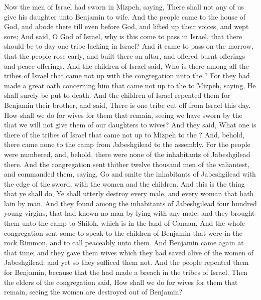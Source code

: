 \columnbreak %

\begin{biblechapter} %
 Now the men of Israel had sworn in Mizpeh, saying, There shall not any of us give his daughter unto Benjamin to wife.
\verse And the people came to the house of God, and abode there till even before God, and lifted up their voices, and wept sore;
\verse And said, O \LORD God of Israel, why is this come to pass in Israel, that there should be to day one tribe lacking in Israel?
\verse And it came to pass on the morrow, that the people rose early, and built there an altar, and offered burnt offerings and peace offerings.
\verse And the children of Israel said, Who is there among all the tribes of Israel that came not up with the congregation unto the \LORD? For they had made a great oath concerning him that came not up to the \LORD to Mizpeh, saying, He shall surely be put to death.
\verse And the children of Israel repented them for Benjamin their brother, and said, There is one tribe cut off from Israel this day.
\verse How shall we do for wives for them that remain, seeing we have sworn by the \LORD that we will not give them of our daughters to wives?
\verse And they said, What one is there of the tribes of Israel that came not up to Mizpeh to the \LORD? And, behold, there came none to the camp from Jabeshgilead to the assembly.
\verse For the people were numbered, and, behold, there were none of the inhabitants of Jabeshgilead there.
\verse And the congregation sent thither twelve thousand men of the valiantest, and commanded them, saying, Go and smite the inhabitants of Jabeshgilead with the edge of the sword, with the women and the children.
\verse And this is the thing that ye shall do, Ye shall utterly destroy every male, and every woman that hath lain by man.
\verse And they found among the inhabitants of Jabeshgilead four hundred young virgins, that had known no man by lying with any male: and they brought them unto the camp to Shiloh, which is in the land of Canaan.
\verse And the whole congregation sent some to speak to the children of Benjamin that were in the rock Rimmon, and to call peaceably unto them.
\verse And Benjamin came again at that time; and they gave them wives which they had saved alive of the women of Jabeshgilead: and yet so they sufficed them not.
\verse And the people repented them for Benjamin, because that the \LORD had made a breach in the tribes of Israel.
\verse Then the elders of the congregation said, How shall we do for wives for them that remain, seeing the women are destroyed out of Benjamin?

\end{biblechapter}
